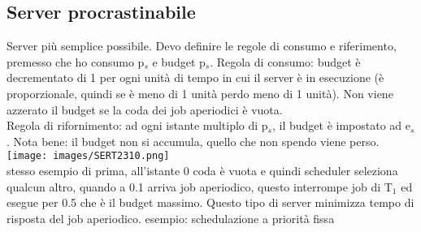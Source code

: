 \documentclass[18px]{article}
\begin{document}
\subsection{Server procrastinabile}
Server più semplice possibile. Devo definire le regole di consumo e riferimento, premesso che ho consumo p$_{s}$ e budget p$_{s}$. Regola di consumo: budget è decrementato di 1 per ogni unità di tempo in cui il server è in esecuzione (è proporzionale, quindi se è meno di 1 unità perdo meno di 1 unità). Non viene azzerato il budget se la coda dei job aperiodici è vuota.\\ Regola di rifornimento: ad ogni istante multiplo di p$_{s}$, il budget è impostato ad e$_{s}$. Nota bene: il budget non si accumula, quello che non spendo viene perso.
\texttt{[image: images/SERT2310.png]}
\\ stesso esempio di prima, all'istante 0 coda è vuota e quindi scheduler seleziona qualcun altro, quando a 0.1 arriva job aperiodico, questo interrompe job di T$_{1}$ ed esegue per 0.5 che è il budget massimo. Questo tipo di server minimizza tempo di risposta del job aperiodico. esempio: schedulazione a priorità fissa\\
\end{document}
